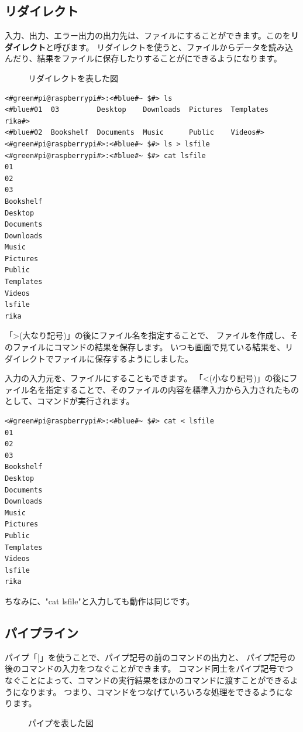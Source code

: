 \subsection{リダイレクト}
入力、出力、エラー出力の出力先は、ファイルにすることができます。このを{\bf リダイレクト}と呼びます。
リダイレクトを使うと、ファイルからデータを読み込んだり、結果をファイルに保存したりすることがにできるようになります。
\begin{figure}
    \centering
    
    \caption{リダイレクトを表した図}
    \label{ch03:redirect}
\end{figure}
\begin{lstlisting}[caption=lsの出力をリダイレクトする, label=redirectLs]
<#green#pi@raspberrypi#>:<#blue#~ $#> ls 
<#blue#01  03         Desktop    Downloads  Pictures  Templates   rika#>
<#blue#02  Bookshelf  Documents  Music      Public    Videos#>
<#green#pi@raspberrypi#>:<#blue#~ $#> ls > lsfile
<#green#pi@raspberrypi#>:<#blue#~ $#> cat lsfile
01
02
03
Bookshelf
Desktop
Documents
Downloads
Music
Pictures
Public
Templates
Videos
lsfile
rika
\end{lstlisting}

「>(大なり記号)」の後にファイル名を指定することで、
ファイルを作成し、そのファイルにコマンドの結果を保存します。
いつも画面で見ている結果を、リダイレクトでファイルに保存するようにしました。

入力の入力元を、ファイルにすることもできます。
「<(小なり記号)」の後にファイル名を指定することで、そのファイルの内容を標準入力から入力されたものとして、コマンドが実行されます。
\begin{lstlisting}[caption=catコマンドにリダイレクトでファイルを入力する, label=redirectCat]
<#green#pi@raspberrypi#>:<#blue#~ $#> cat < lsfile
01
02
03
Bookshelf
Desktop
Documents
Downloads
Music
Pictures
Public
Templates
Videos
lsfile
rika
\end{lstlisting}

ちなみに、"cat lsfile"と入力しても動作は同じです。

\subsection{パイプライン}\label{sec:pipelne}

パイプ「|」を使うことで、パイプ記号の前のコマンドの出力と、
パイプ記号の後のコマンドの入力をつなぐことができます。
コマンド同士をパイプ記号でつなぐことによって、コマンドの実行結果をほかのコマンドに渡すことができるようになります。
つまり、コマンドをつなげていろいろな処理をできるようになります。
\begin{figure}[h]
    \centering
    
    \caption{パイプを表した図}
    \label{ch03:pipe}
\end{figure}

